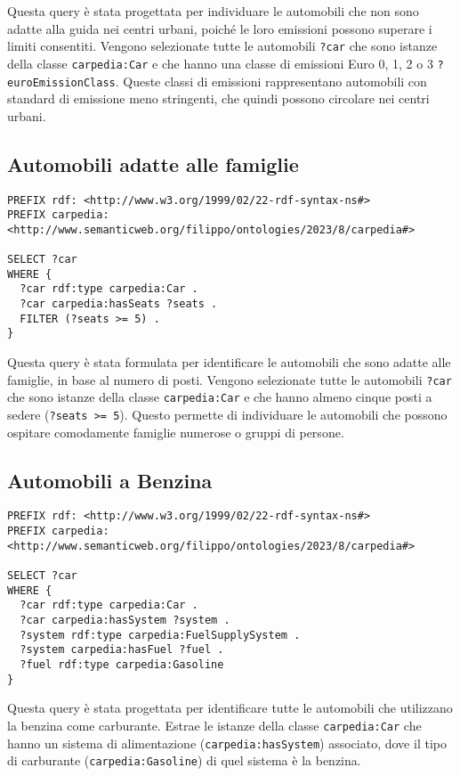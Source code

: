 Questa query è stata progettata per individuare le automobili che non sono adatte alla guida nei centri urbani,
poiché le loro emissioni possono superare i limiti consentiti.
Vengono selezionate tutte le automobili \texttt{?car} che sono istanze della classe \texttt{carpedia:Car} e che hanno una classe di emissioni Euro 0, 1, 2 o 3 \texttt{?euroEmissionClass}.
Queste classi di emissioni rappresentano automobili con standard di emissione meno stringenti, che quindi possono circolare nei centri urbani.

\subsection{Automobili adatte alle famiglie}

\begin{lstlisting}[language=SPARQL]
PREFIX rdf: <http://www.w3.org/1999/02/22-rdf-syntax-ns#>
PREFIX carpedia: <http://www.semanticweb.org/filippo/ontologies/2023/8/carpedia#>

SELECT ?car
WHERE {
  ?car rdf:type carpedia:Car .
  ?car carpedia:hasSeats ?seats .
  FILTER (?seats >= 5) .
}
\end{lstlisting}


Questa query è stata formulata per identificare le automobili che sono adatte alle famiglie, in base al numero
di posti. Vengono selezionate tutte le automobili \texttt{?car} che sono istanze della classe \texttt{carpedia:Car} e
che hanno almeno cinque posti a sedere (\texttt{?seats >= 5}). Questo permette di individuare le automobili che possono ospitare comodamente famiglie numerose o gruppi di persone.

\subsection{Automobili a Benzina}

\begin{lstlisting}[language=SPARQL]
PREFIX rdf: <http://www.w3.org/1999/02/22-rdf-syntax-ns#>
PREFIX carpedia: <http://www.semanticweb.org/filippo/ontologies/2023/8/carpedia#>

SELECT ?car
WHERE {
  ?car rdf:type carpedia:Car .
  ?car carpedia:hasSystem ?system .
  ?system rdf:type carpedia:FuelSupplySystem .
  ?system carpedia:hasFuel ?fuel .
  ?fuel rdf:type carpedia:Gasoline
}
\end{lstlisting}


Questa query è stata progettata per identificare tutte le automobili che utilizzano la benzina come carburante.
Estrae le istanze della classe \texttt{carpedia:Car} che hanno un sistema di alimentazione (\texttt{carpedia:hasSystem}) associato, dove il tipo di carburante (\texttt{carpedia:Gasoline}) di quel sistema è la benzina.

